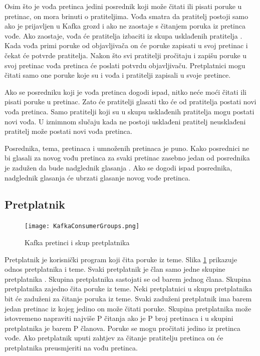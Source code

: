 \documentclass[utf8, diplomski, lmodern, numeric]{fer}
\begin{document}
Osim što je vođa pretinca jedini posrednik koji može čitati ili pisati poruke u pretinac, on mora brinuti o pratiteljima. Vođa smatra da pratitelj postoji samo ako je prijavljen u Kafka grozd i ako ne zaostaje s čitanjem poruka iz pretinca vođe. Ako zaostaje, vođa će pratitelja izbaciti iz skupa usklađenih pratitelja . Kada vođa primi poruke od objavljivača on će poruke zapisati u svoj pretinac i čekat će potvrde pratitelja. Nakon što svi pratitelji pročitaju i zapišu poruke u svoj pretinac vođa pretinca će poslati potvrdu objavljivaču. Pretplatnici mogu čitati samo one poruke koje su i vođa i pratitelji zapisali u svoje pretince.

Ako se posredniku koji je vođa pretinca dogodi ispad, nitko neće moći čitati ili pisati poruke u pretinac. Zato će pratitelji glasati tko će od pratitelja postati novi vođa pretinca. Samo pratitelji koji su u skupu usklađenih pratitelja mogu postati novi vođa. U iznimnom slučaju kada ne postoji usklađeni pratitelj neusklađeni pratitelj može postati novi vođa pretinca.

Posrednika, tema, pretinaca i umnoženih pretinaca je puno. Kako posrednici ne bi glasali za novog vođu pretinca za svaki pretinac zasebno jedan od posrednika je zadužen da bude nadglednik glasanja . Ako se dogodi ispad posrednika, nadglednik glasanja će ubrzati glasanje novog vođe pretinca.

\subsection{Pretplatnik}

\begin{figure}[H]
    \centering
    \texttt{[image: KafkaConsumerGroups.png]}
    \caption{Kafka pretinci i skup pretplatnika}
    \label{fig:kafka-consumer-group}
\end{figure}

Pretplatnik  je korisnički program koji čita poruke iz teme. Slika \ref{fig:kafka-consumer-group} prikazuje odnos pretplatnika i teme. Svaki pretplatnik je član samo jedne skupine pretplatnika . Skupina pretplatnika sastojati se od barem jednog člana. Skupina pretplatnika zajedno čita poruke iz teme. Neki pretplatnici u skupu pretplatnika bit će zaduženi za čitanje poruka iz teme. Svaki zaduženi pretplatnik ima barem jedan pretinac iz kojeg jedino on može čitati poruke. Skupina pretplatnika može istovremeno napraviti najviše P čitanja ako je P broj pretinaca i u skupini pretplatnika je barem P članova. Poruke se mogu pročitati jedino iz pretinca vođe. Ako pretplatnik uputi zahtjev za čitanje pratitelju pretinca on će pretplatnika preusmjeriti na vođu pretinca.
\end{document}
